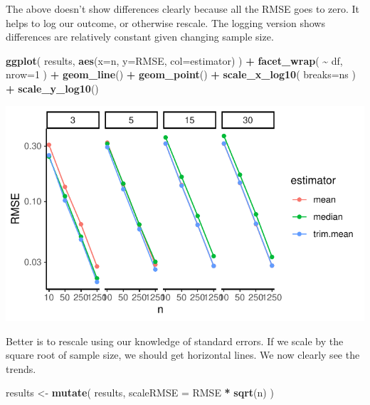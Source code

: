 \documentclass[
]{book}
\newenvironment{Shaded}{\begin{snugshade}}{\end{snugshade}}
\newcommand{\AttributeTok}[1]{\textcolor[rgb]{0.13,0.29,0.53}{#1}}
\newcommand{\DecValTok}[1]{\textcolor[rgb]{0.00,0.00,0.81}{#1}}
\newcommand{\FunctionTok}[1]{\textcolor[rgb]{0.13,0.29,0.53}{\textbf{#1}}}
\newcommand{\NormalTok}[1]{#1}
\newcommand{\OtherTok}[1]{\textcolor[rgb]{0.56,0.35,0.01}{#1}}
\newcommand{\SpecialCharTok}[1]{\textcolor[rgb]{0.81,0.36,0.00}{\textbf{#1}}}
\begin{document}
The above doesn't show differences clearly because all the RMSE goes to zero.
It helps to log our outcome, or otherwise rescale. The logging version shows
differences are relatively constant given changing sample size.

\begin{Shaded}
\begin{Highlighting}[]
\FunctionTok{ggplot}\NormalTok{( results, }\FunctionTok{aes}\NormalTok{(}\AttributeTok{x=}\NormalTok{n, }\AttributeTok{y=}\NormalTok{RMSE, }\AttributeTok{col=}\NormalTok{estimator) ) }\SpecialCharTok{+}
    \FunctionTok{facet\_wrap}\NormalTok{( }\SpecialCharTok{\textasciitilde{}}\NormalTok{ df, }\AttributeTok{nrow=}\DecValTok{1}\NormalTok{ ) }\SpecialCharTok{+}
    \FunctionTok{geom\_line}\NormalTok{() }\SpecialCharTok{+} \FunctionTok{geom\_point}\NormalTok{() }\SpecialCharTok{+}
    \FunctionTok{scale\_x\_log10}\NormalTok{( }\AttributeTok{breaks=}\NormalTok{ns ) }\SpecialCharTok{+}
    \FunctionTok{scale\_y\_log10}\NormalTok{()}
\end{Highlighting}
\end{Shaded}

\begin{center}\includegraphics[width=0.75\linewidth]{Designing-Simulations-in-R_files/figure-latex/unnamed-chunk-183-1} \end{center}

Better is to rescale using our knowledge of standard errors. If we scale by
the square root of sample size, we should get horizontal lines. We now
clearly see the trends.

\begin{Shaded}
\begin{Highlighting}[]
\NormalTok{results }\OtherTok{\textless{}{-}} \FunctionTok{mutate}\NormalTok{( results, }\AttributeTok{scaleRMSE =}\NormalTok{ RMSE }\SpecialCharTok{*} \FunctionTok{sqrt}\NormalTok{(n) )}
\end{Highlighting}
\end{Shaded}
\end{document}
